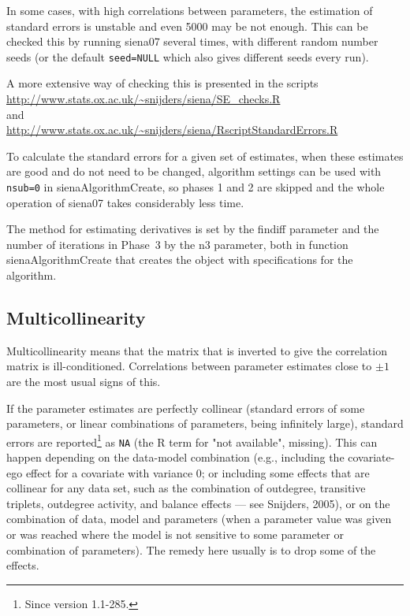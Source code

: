 \documentclass[a4paper,fleqn,11pt]{article}
\newcommand{\+}{\, + \,}
\newcommand{\sfn}[1]{\textsf{#1}}
\begin{document}
In some cases, with high correlations between parameters,
the estimation of standard errors is unstable and even 5000 may be not enough.
This can be checked this by running \textsf{siena07} several times, with different
random number seeds (or the default \texttt{seed=NULL} which also gives different
seeds every run).

A more extensive way of checking this is presented in the scripts\\
{\url{http://www.stats.ox.ac.uk/~snijders/siena/SE_checks.R}~} \\
and \\
{\url{http://www.stats.ox.ac.uk/~snijders/siena/RscriptStandardErrors.R}~}
\medskip


To calculate the standard errors for a
given set of estimates, when these estimates are good and do not need to be changed,
algorithm settings can be used with \texttt{nsub=0}
in \sfn{sienaAlgorithmCreate}, so phases 1 and 2 are
skipped and the whole operation of \sfn{siena07} takes considerably less time.
\medskip

The method for estimating derivatives is set
by the \sfn{findiff} parameter and the number of iterations in Phase~3
by the \sfn{n3} parameter, both in function \sfn{sienaAlgorithmCreate}
that creates the object with specifications for the algorithm.

\subsection{Multicollinearity}

Multicollinearity means that the matrix that is inverted
to give the correlation matrix is ill-conditioned.
Correlations between parameter estimates
close to $\pm 1$ are the most usual signs of this.

If the parameter estimates are perfectly collinear
(standard errors of some parameters, or linear combinations
of parameters, being infinitely large), standard errors
are reported\footnote{Since version 1.1-285.}
as \texttt{NA} (the R term for "not available", missing).
This can happen depending on the data-model combination
(e.g., including the covariate-ego effect for a covariate with variance 0;
or including some effects that are collinear for any data set,
such as the combination of outdegree, transitive triplets,
outdegree activity, and balance effects --- see Snijders, 2005),
or on the combination of data, model and parameters (when a parameter
value was given or was reached where the model is not sensitive to some
parameter or combination of parameters).
The remedy here usually is to drop some of the effects.
\medskip
\end{document}
